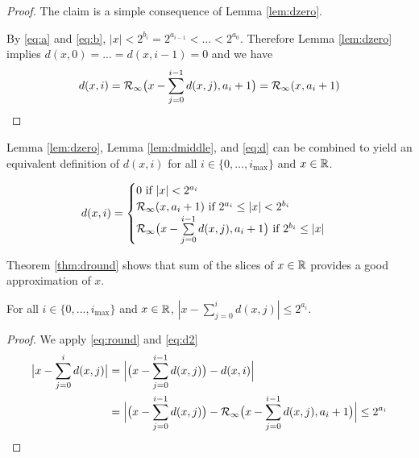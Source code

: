     \begin{proof}
      The claim is a simple consequence of Lemma \ref{lem:dzero}.

      By  \eqref{eq:a} and \eqref{eq:b}, $|x| < 2^{b_i} = 2^{a_{i - 1}} < \ldots <2^{a_0}$.
      Therefore Lemma \ref{lem:dzero} implies $d(x, 0) = ... = d(x, i - 1) = 0$
      and we have
      \[
        d(x, i) = \mathcal{R}_\text{$\infty$}\bigl(x - \sum\limits_{j = 0}^{i - 1}d(x, j), a_{i} + 1\bigr)
            = \mathcal{R}_\text{$\infty$}(x, a_{i} + 1)
      \]
    \end{proof}

    Lemma \ref{lem:dzero}, Lemma \ref{lem:dmiddle}, and \eqref{eq:d} can be
    combined to yield an equivalent definition of $d(x, i)$ for all $i \in \{0,
    ..., i_{\max}\}$ and $x \in \mathbb{R}$.

    \begin{equation}
      d(x, i) = \begin{cases}
        0 \text{ if } |x| < 2^{a_i}\\
        \mathcal{R}_\text{$\infty$}(x, a_i + 1) \text{ if } 2^{a_i} \leq |x| < 2^{b_i}\\
        \mathcal{R}_\text{$\infty$}\bigl(x - \sum\limits_{j=0}^{i - 1}d(x,j), a_i + 1\bigr) \text{ if } 2^{b_i} \leq |x|
        \end{cases}
      \label{eq:d2}
    \end{equation}

    Theorem \ref{thm:dround} shows that sum of the slices of $x \in \mathbb{R}$
    provides a good approximation of $x$.

    \begin{samepage}
    \begin{thm}
      For all $i \in \{0, ..., i_{\max}\}$ and $x \in \mathbb{R}$,
      $|x - \sum \limits_{j = 0}^id(x, j)| \leq 2^{a_i}$.
      \label{thm:dround}
    \end{thm}
    \end{samepage}

    \begin{proof}
      We apply  \eqref{eq:round} and \eqref{eq:d2}
      \begin{align*}
        \bigl|x - \sum \limits_{j = 0}^{i}d(x, j)\bigr| & = \Bigl|\bigl(x - \sum \limits_{j = 0}^{i - 1}d(x, j)\bigr) - d(x, i)\Bigr| \\
         & = \Bigl|\bigl(x - \sum \limits_{j = 0}^{i - 1}d(x, j)\bigr) - \mathcal{R}_\text{$\infty$}\bigl(x - \sum \limits_{j = 0}^{i - 1}d(x, j), a_{i} + 1\bigr)\Bigr| \leq 2^{a_{i}}
      \end{align*}
    \end{proof}

